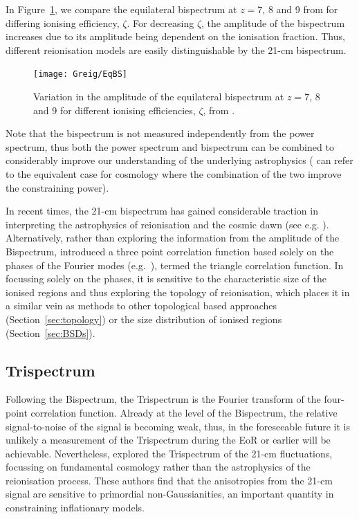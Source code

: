 In Figure~\ref{fig:EqBS}, we compare the equilateral bispectrum at $z=7$, 8 and 9 from \cite{Shimabukuro:2017} for differing ionising efficiency, $\zeta$. For decreasing $\zeta$, the amplitude of the bispectrum increases due to its amplitude being dependent on the ionisation fraction. Thus, different reionisation models are easily distinguishable by the 21-cm bispectrum.

\begin{figure}[]
\begin{center}
\texttt{[image: Greig/EqBS]}
\end{center}
\caption{Variation in the amplitude of the equilateral bispectrum at $z=7$, 8 and 9 for different ionising efficiencies, $\zeta$, from \cite{Shimabukuro:2017}.}
\label{fig:EqBS}
\end{figure}

Note that the bispectrum is not measured independently from the power spectrum, thus both the power spectrum and bispectrum can be combined to considerably improve our understanding of the underlying astrophysics ({\color{red} can refer to the equivalent case for cosmology where the combination of the two improve the constraining power}).

In recent times, the 21-cm bispectrum has gained considerable traction in interpreting the astrophysics of reionisation and the cosmic dawn (see e.g. \cite{Bharadwaj:2005,Pillepich:2007,Yoshiura:2015,Shimabukuro:2016,Shimabukuro:2017,Watkinson:2017,Majumdar:2018,Hutter:2019,Trott:2019,Watkinson:2019}). Alternatively, rather than exploring the information from the amplitude of the Bispectrum, \cite{Gorce:2019} introduced a three point correlation function based solely on the phases of the Fourier modes (e.g.~\cite{Obreschkow:2013}), termed the triangle correlation function. In focussing solely on the phases, it is sensitive to the characteristic size of the ionised regions and thus exploring the topology of reionisation, which places it in a similar vein as methods to other topological based approaches (Section~\ref{sec:topology}) or the size distribution of ionised regions (Section~\ref{sec:BSDs}). 

\subsection{Trispectrum} \label{sec:trispectrum}

Following the Bispectrum, the Trispectrum is the Fourier transform of the four-point correlation function. Already at the level of the Bispectrum, the relative signal-to-noise of the signal is becoming weak, thus, in the foreseeable future it is unlikely a measurement of the Trispectrum during the EoR or earlier will be achievable. Nevertheless, \cite{Cooray:2008} explored the Trispectrum of the 21-cm fluctuations, focussing on fundamental cosmology rather than the astrophysics of the reionisation process. These authors find that the anisotropies from the 21-cm signal are sensitive to primordial non-Gaussianities, an important quantity in constraining inflationary models.

